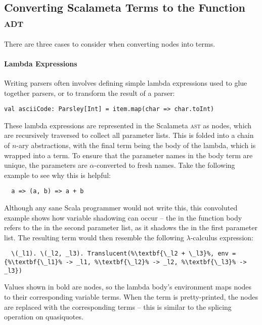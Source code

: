 \documentclass[../../main.tex]{subfiles}
\begin{document}

\subsection{Converting Scalameta Terms to the Function \textsc{adt}}
There are three cases to consider when converting  nodes into  terms.

\paragraph{Lambda Expressions}
Writing parsers often involves defining simple lambda expressions used to glue together parsers, or to transform the result of a parser:
\begin{verbatim}
val asciiCode: Parsley[Int] = item.map(char => char.toInt)
\end{verbatim}

These lambda expressions are represented in the Scalameta \textsc{ast} as  nodes, which are recursively traversed to collect all parameter lists.
This is folded into a chain of $n$-ary abstractions, with the final term being the body of the lambda, which is wrapped into a  term.
To ensure that the parameter names in the  body term are unique, the parameters are $\alpha$-converted to fresh names.
Take the following example to see why this is helpful:
\begin{verbatim}
  a => (a, b) => a + b
\end{verbatim}
Although any sane Scala programmer would not write this, this convoluted example shows how variable shadowing can occur -- the  in the function body refers to the  in the second parameter list, as it shadows the  in the first parameter list.
The resulting  term would then resemble the following $\lambda$-calculus expression:
\begin{lstlisting}
  \(_l1). \(_l2, _l3). Translucent(%\textbf{\_l2 + \_l3}%, env = {%\textbf{\_l1}% -> _l1, %\textbf{\_l2}% -> _l2, %\textbf{\_l3}% -> _l3})
\end{lstlisting}
Values shown in bold are  nodes, so the lambda body's environment maps  nodes to their corresponding variable terms.
When the term is pretty-printed, the  nodes are replaced with the corresponding  terms -- this is similar to the splicing operation on quasiquotes.
\end{document}
